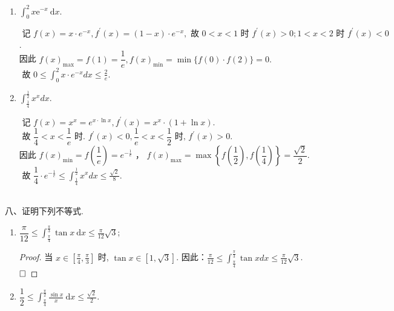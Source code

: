 \documentclass[lang=cn,newtx,10pt,scheme=chinese]{elegantbook}
\begin{document}
\begin{enumerate}
\item $ \displaystyle\int_0^2 x \mathrm{e}^{-x} \mathrm{~d} x .$\\
\begin{solution}
	$\text { 记 } f(x)=x \cdot e^{-x}, f^{\prime}(x)=(1-x) \cdot e^{-x},\text { 故 } 0<x<1 \text { 时 } f^{\prime}(x)>0;1<x<2 \text { 时 } f^{\prime}(x)<0$.\\
	因此 $f(x)_{\max }=f(1)=\dfrac{1}{e} ,f(x)_{\min }=\min \{f(0) \cdot f(2)\}=0 .$\\
	$\text { 故 } 0 \leqslant \displaystyle\int_0^2 x \cdot e^{-x} d x \leqslant \frac{2}{e}.$
\end{solution}
\item $ \displaystyle\int_{\frac{1}{4}}^{\frac{1}{2}} x^x d x .$ \\
\begin{solution}
	$ \text { 记 } f(x)=x^x=e^{x \cdot \ln x},f^{\prime}(x)=x^x \cdot(1+\ln x). $
	$ \text { 故 } \dfrac{1}{4}<x<\dfrac{1}{e} \text { 时. } f^{\prime}(x)<0,\dfrac{1}{e}<x<\dfrac{1}{2} \text { 时, } f^{\prime}(x)>0. $ \\
	 因此 $f(x)_{\min }=f\left(\dfrac{1}{e}\right)=e^{-\frac{1}{e}}$  ，
	$f(x)_{\max }=\max \left\{f\left(\dfrac{1}{2}\right), f\left(\dfrac{1}{4}\right)\right\}=\dfrac{\sqrt{2}}{2}.$ \\
	$\text { 故 } \dfrac{1}{4} \cdot e^{-\frac{1}{e}} \leqslant \displaystyle\int_{\frac{1}{4}}^{\frac{1}{2}} x^x d x \leqslant \frac{\sqrt{2}}{8}.$
\end{solution}
\end{enumerate}



~\\
八、证明下列不等式.\\
\begin{enumerate}
\item  $\displaystyle\dfrac{\pi}{12} \leqslant \int_{\frac{\pi}{4}}^{\frac{\pi}{3}} \tan x \mathrm{~d} x \leqslant \frac{\pi}{12} \sqrt{3}$;\\
\begin{proof}
	当 $x\displaystyle \in\left[\frac{\pi}{4}, \frac{\pi}{3}\right]$ 时, $\tan x \in[1, \sqrt{3}]$.
	因此：$\displaystyle\frac{\pi}{12} \leq \int_{\frac{\pi}{4}}^{\frac{\pi}{3}} \tan x d x \leq \frac{\pi}{12} \sqrt{3}$.$\hfill\square$
\end{proof}


\item  $\dfrac{1}{2} \leqslant \displaystyle\int_{\frac{\pi}{4}}^{\frac{\pi}{2}} \frac{\sin x}{x} \mathrm{~d} x \leqslant \frac{\sqrt{2}}{2} .$ \\
\end{enumerate}
\end{document}
